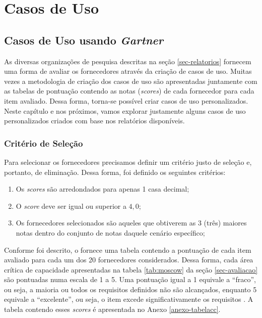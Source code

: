 \part{Casos de Uso}
\label{parte-estudosdecaso}



\chapter{Casos de Uso usando \emph{Gartner}}
\label{cap-casos-gartner}

As diversas organizações de pesquisa descritas na seção \ref{sec-relatorios} fornecem uma forma de avaliar os fornecedores através da criação de casos de uso. Muitas vezes a metodologia de criação dos casos de uso são apresentadas juntamente com as tabelas de pontuação contendo as notas (\emph{scores}) de cada fornecedor para cada item avaliado. Dessa forma, torna-se possível criar casos de uso personalizados. Neste capítulo e nos próximos, vamos explorar justamente alguns casos de uso personalizados criados com base nos relatórios disponíveis.


\section{Critério de Seleção}
\label{sec-criteriog}

Para selecionar os fornecedores precisamos definir um critério justo de seleção e, portanto, de eliminação. Dessa forma, foi definido os seguintes critérios:

\begin{enumerate}
    \item Os \emph{scores} são arredondados para apenas 1 casa decimal;  
    \item O \emph{score} deve ser igual ou superior a $4,0$;
    \item Os fornecedores selecionados são aqueles que obtiverem as 3 (três) maiores notas dentro do conjunto de notas daquele cenário específico; 
\end{enumerate}

Conforme foi descrito, o \relGCC \xspace fornece uma tabela contendo a pontuação de cada item avaliado para cada um dos 20 fornecedores considerados. Dessa forma, cada área crítica de capacidade apresentadas na tabela \ref{tab:moscow} da seção \ref{sec-avaliacao} são pontuadas numa escala de 1 a 5. Uma pontuação igual a 1 equivale a ``fraco'', ou seja, a maioria ou todos os requisitos definidos não são alcançados, enquanto 5 equivale a 
``excelente'', ou seja, o item excede significativamente os requisitos \cite{gartner:criticalcapabilities}. A tabela contendo esses \emph{scores} é apresentada no Anexo \ref{anexo-tabelacc}.

